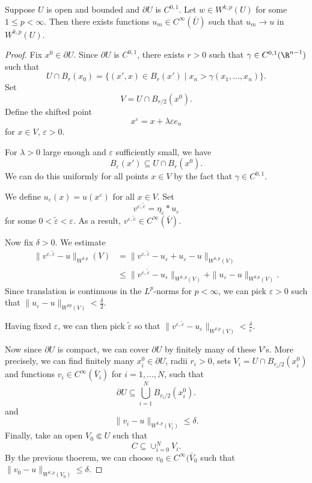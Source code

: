 \documentclass[a4paper]{article}
\begin{document}
\begin{thm}
  Suppose $U$ is open and bounded and $\partial U$ is $C^{0, 1}$. Let $w \in W^{k, p}(U)$ for some $1 \leq p < \infty$. Then there exists functions $u_m \in C^\infty(\bar{U})$ such that $u_m \to u$ in $W^{k, p}(U)$.
\end{thm}

\begin{proof}
  Fix $x^0 \in \partial U$. Since $\partial U$ is $C^{0, 1}$, there exists $r > 0$ such that $\gamma \in C^{0, 1}(\R^{n - 1})$ such that
  \[
    U \cap B_r(x_0) = \{(x', x) \in B_r(x') \mid x_n > \gamma(x_1, \ldots, x_n)\}.
  \]
  Set
  \[
    V = U \cap B_{r/2}(x^0).
  \]
  Define the shifted point
  \[
    x^{\varepsilon} = x + \lambda \varepsilon e_n
  \]
  for $x \in V$, $\varepsilon > 0$.

  For $\lambda > 0$ large enough and $\varepsilon$ sufficiently small, we have
  \[
    B_\varepsilon(x') \subseteq U \cap B_r(x^0).
  \]
  We can do this uniformly for all points $x \in V$ by the fact that $\gamma \in C^{0, 1}$.

  We define $u_\varepsilon(x) = u(x^\varepsilon)$ for all $x \in V$. Set
  \[
    v^{\varepsilon, \tilde{\varepsilon}} = \eta_{\tilde{\varepsilon}} * u_\varepsilon
  \]
  for some $0 < \tilde{\varepsilon} < \varepsilon$. As a result, $v^{\varepsilon, \tilde{\varepsilon}} \in C^\infty(\bar{V})$.

  Now fix $\delta > 0$. We estimate
  \begin{align*}
    \|v^{\varepsilon, \tilde{\varepsilon}} - u\|_{W^{k. p}}(V) &= \|v^{\varepsilon, \tilde{\varepsilon}} - u_\varepsilon + u_\varepsilon - u\|_{W^{k, p}(V)}\\
    &\leq \|v^{\varepsilon, \tilde{\varepsilon}} - u_\varepsilon\|_{W^{k, p}(V)} + \|u_\varepsilon - u\|_{W^{k. p}(V)}.
  \end{align*}
  Since translation is continuous in the $L^p$-norms for $p < \infty$, we can pick $\varepsilon > 0$ such that $\|u_\varepsilon - u\|_{W^{k p}(V)} < \frac{\delta}{2}$.

  Having fixed $\varepsilon$, we can then pick $\tilde{\varepsilon}$ so that $\|v^{\varepsilon, \tilde{\varepsilon}} - u_\varepsilon\|_{W^{k. p}(V)} < \frac{\delta}{\varepsilon}$.

  Now since $\partial U$ is compact, we can cover $\partial U$ by finitely many of these $V$'s. More precisely, we can find finitely many $x_i^0 \in \partial U$, radii $r_i > 0$, sets $V_i = U \cap B_{r_i/2}(x_i^0)$ and functions $v_i \in C^\infty(\bar{V}_i)$ for $i = 1, \ldots, N$, such that
  \[
    \partial U \subseteq \bigcup_{i = 1}^N B_{r_i/2}(x_i^0).
  \]
  and
  \[
    \|v_i - u\|_{W^{k, p}(V_i)} \leq \delta.
  \]
  Finally, take an open $V_0 \Subset U$ such that
  \[
    C \subseteq \cup_{i = 0}^N V_i.
  \]
  By the previous thoerem, we can choose $v_0 \in C^{\infty}(\bar{V}_0$ such that $\|v_0 - u\|_{W^{k, p}(V_0)} \leq \delta$.


\end{proof}
\end{document}

